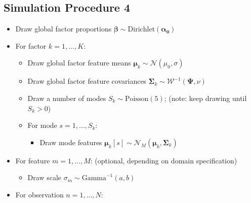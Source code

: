 \documentclass[twoside,11pt]{article}
\begin{document}
\subsection{Simulation Procedure 4}
\label{app:sim4}
\begin{itemize}
    \item Draw global factor proportions $\boldsymbol{\beta} \sim \mbox{Dirichlet}(\boldsymbol{\alpha_0})$
    \item For factor $k=1,\dots,K$:
    \begin{itemize}
        \item Draw global factor feature means $\boldsymbol{\mu}_k \sim \mathcal{N}(\mu_0, \sigma)$ 
        \item Draw global factor feature covariances $\boldsymbol{\Sigma}_k \sim \mathcal{W}^{-1}(\boldsymbol{\Psi}, \nu)$
        \item Draw a number of modes $S_k \sim \mbox{Poisson}(5)$; \hspace{10pt} (note: keep drawing until $S_k>0$)
        \item For mode $s=1,\dots,S_k$:
        \begin{itemize}
            \item Draw mode features $\boldsymbol{\mu}_k[s] \sim \mathcal{N}_M(\boldsymbol{\mu}_{k}, \boldsymbol{\Sigma}_{k})$
        \end{itemize}
        
    \end{itemize}
    \item For feature $m=1,\dots,M$: (optional, depending on domain specification)
    \begin{itemize}
        \item Draw scale $\sigma_m \sim \mbox{Gamma}^{-1}(a, b)$
    \end{itemize}
    \item For observation $n=1,\dots,N$:
    \begin{itemize}
        

\end{itemize}
\end{itemize}
\end{document}
